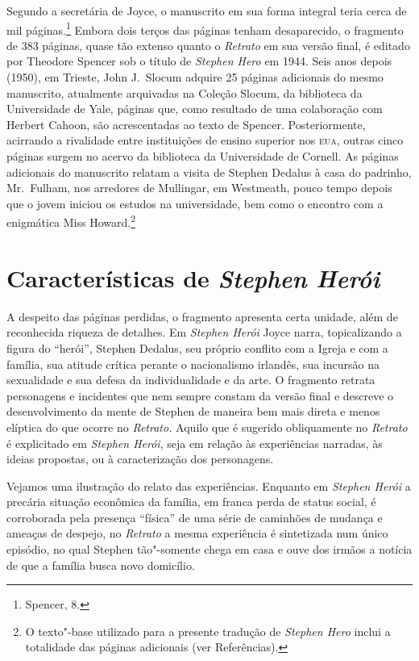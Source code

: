 Segundo a secretária de Joyce, o manuscrito em sua forma integral teria
cerca de mil páginas.\footnote{ Spencer, 8.} Embora dois terços das páginas
tenham desaparecido, o fragmento de 383 páginas, quase tão extenso
quanto o \textit{Retrato} em sua versão final, é editado por Theodore
Spencer sob o título de \textit{Stephen Hero} em 1944.  
Seis anos depois (1950), em Trieste, John J.~Slocum adquire
25 páginas adicionais do mesmo manuscrito, atualmente
arquivadas na Coleção Slocum, da biblioteca da Universidade de Yale,
páginas que, como resultado de uma colaboração com Herbert Cahoon, são
acrescentadas ao texto de Spencer.  Posteriormente, acirrando a
rivalidade entre instituições de ensino superior nos \textsc{eua}, outras cinco
páginas surgem no acervo da biblioteca da Universidade de Cornell.  As
páginas adicionais do manuscrito relatam a visita de Stephen Dedalus à
casa do padrinho, Mr.~Fulham, nos arredores de Mullingar, em Westmeath,
pouco tempo depois que o jovem iniciou os estudos na universidade, bem
como o encontro com a enigmática Miss Howard.\footnote{ O texto"-base
utilizado para a presente tradução de \textit{Stephen Hero} inclui a
totalidade das páginas adicionais (ver Referências).}


\section*{Características de \textit{Stephen Herói}}

A despeito das páginas perdidas, o fragmento apresenta certa unidade,
além de reconhecida riqueza de detalhes.  Em \textit{Stephen Herói}
Joyce narra, topicalizando a figura do “herói”, Stephen Dedalus, seu
próprio conflito com a Igreja e com a família, sua atitude crítica
perante o nacionalismo irlandês, sua incursão na sexualidade e sua
defesa da individualidade e da arte.  O fragmento
retrata personagens e incidentes que nem sempre constam da versão final
e descreve o desenvolvimento da mente de Stephen de maneira bem mais
direta e menos elíptica do que ocorre no \textit{Retrato.}  Aquilo
que é sugerido obliquamente no \textit{Retrato} é explicitado em
\textit{Stephen Herói}, seja em relação às experiências narradas, às
ideias propostas, ou à caracterização dos personagens.

Vejamos uma ilustração do relato das experiências.  Enquanto em
\textit{Stephen Herói} a precária situação econômica da família, em
franca perda de status social, é corroborada pela presença “física” de
uma série de caminhões de mudança e ameaças de despejo, no		
\textit{Retrato} a mesma experiência é sintetizada num único episódio,
no qual Stephen tão"-somente chega em casa e ouve dos irmãos a notícia
de que a família busca novo domicílio.

